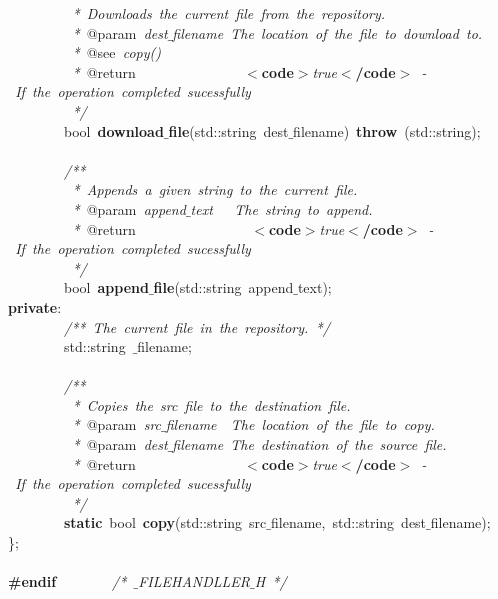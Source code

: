 \mbox{}\textit{\ \ \ \ \ \ \ \ \ *\ Downloads\ the\ current\ file\ from\ the\ repository.} \\
\mbox{}\textit{\ \ \ \ \ \ \ \ \ *\ }@param\textit{\ dest$\_$filename\ The\ location\ of\ the\ file\ to\ download\ to.} \\
\mbox{}\textit{\ \ \ \ \ \ \ \ \ *\ }@see\textit{\ copy()} \\
\mbox{}\textit{\ \ \ \ \ \ \ \ \ *\ }@return\textit{\ \ \ \ \ \ \ \ \ \ \ \ \ \ \ }\textbf{$<$code$>$}\textit{true}\textbf{$<$/code$>$}\textit{\ -\ If\ the\ operation\ completed\ sucessfully} \\
\mbox{}\textit{\ \ \ \ \ \ \ \ \ */} \\
\mbox{}\ \ \ \ \ \ \ \ bool\ \textbf{download$\_$file}(std::string\ dest$\_$filename)\ \textbf{throw}\ (std::string); \\
\mbox{} \\
\mbox{}\ \ \ \ \ \ \ \ \textit{/**} \\
\mbox{}\textit{\ \ \ \ \ \ \ \ \ *\ Appends\ a\ given\ string\ to\ the\ current\ file.} \\
\mbox{}\textit{\ \ \ \ \ \ \ \ \ *\ }@param\textit{\ append$\_$text\ \ \ The\ string\ to\ append.} \\
\mbox{}\textit{\ \ \ \ \ \ \ \ \ *\ }@return\textit{\ \ \ \ \ \ \ \ \ \ \ \ \ \ \ \ }\textbf{$<$code$>$}\textit{true}\textbf{$<$/code$>$}\textit{\ -\ If\ the\ operation\ completed\ sucessfully} \\
\mbox{}\textit{\ \ \ \ \ \ \ \ \ */} \\
\mbox{}\ \ \ \ \ \ \ \ bool\ \textbf{append$\_$file}(std::string\ append$\_$text); \\
\mbox{}\textbf{private}: \\
\mbox{}\ \ \ \ \ \ \ \ \textit{/**\ The\ current\ file\ in\ the\ repository.\ */} \\
\mbox{}\ \ \ \ \ \ \ \ std::string\ $\_$filename; \\
\mbox{} \\
\mbox{}\ \ \ \ \ \ \ \ \textit{/**} \\
\mbox{}\textit{\ \ \ \ \ \ \ \ \ *\ Copies\ the\ src\ file\ to\ the\ destination\ file.} \\
\mbox{}\textit{\ \ \ \ \ \ \ \ \ *\ }@param\textit{\ src$\_$filename\ \ The\ location\ of\ the\ file\ to\ copy.} \\
\mbox{}\textit{\ \ \ \ \ \ \ \ \ *\ }@param\textit{\ dest$\_$filename\ The\ destination\ of\ the\ source\ file.} \\
\mbox{}\textit{\ \ \ \ \ \ \ \ \ *\ }@return\textit{\ \ \ \ \ \ \ \ \ \ \ \ \ \ \ }\textbf{$<$code$>$}\textit{true}\textbf{$<$/code$>$}\textit{\ -\ If\ the\ operation\ completed\ sucessfully} \\
\mbox{}\textit{\ \ \ \ \ \ \ \ \ */} \\
\mbox{}\ \ \ \ \ \ \ \ \textbf{static}\ bool\ \textbf{copy}(std::string\ src$\_$filename,\ std::string\ dest$\_$filename); \\
\mbox{}\}; \\
\mbox{} \\
\mbox{}\textbf{\#endif}\ \ \ \ \ \ \ \ \textit{/*\ $\_$FILEHANDLLER$\_$H\ */} \\
\mbox{} \\

